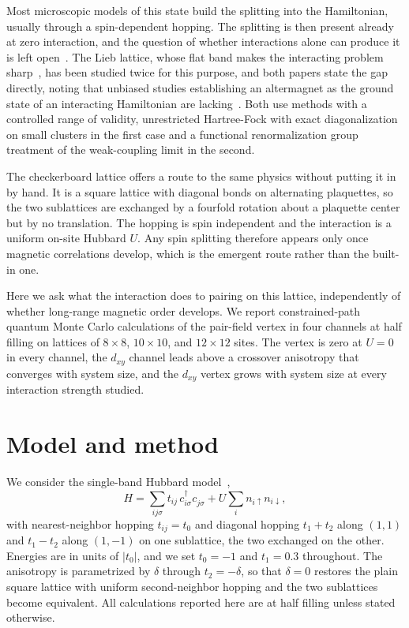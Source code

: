 \documentclass[aps,prb,reprint,superscriptaddress,amsmath,amssymb,floatfix]{revtex4-2}
\begin{document}
Most microscopic models of this state build the splitting into the Hamiltonian,
usually through a spin-dependent hopping. The splitting is then present already
at zero interaction, and the question of whether interactions alone can produce
it is left open~\cite{Leeb2024}. The Lieb lattice, whose flat band makes the
interacting problem sharp~\cite{Lieb1989,Mielke1991,Tasaki1992}, has been studied
twice for this purpose, and both papers state the gap directly,
noting that unbiased studies establishing an altermagnet as the ground state of
an interacting Hamiltonian are lacking~\cite{Kaushal2025,Duerrnagel2025}. Both
use methods with a controlled range of validity, unrestricted Hartree-Fock with
exact diagonalization on small clusters in the first case and a functional
renormalization group treatment of the weak-coupling limit in the second.

The checkerboard lattice offers a route to the same physics without putting it in
by hand. It is a square lattice with diagonal bonds on alternating plaquettes, so
the two sublattices are exchanged by a fourfold rotation about a plaquette center
but by no translation. The hopping is spin independent and the interaction is a
uniform on-site Hubbard $U$. Any spin splitting therefore appears only once
magnetic correlations develop, which is the emergent route rather than the
built-in one.

Here we ask what the interaction does to pairing on this lattice, independently
of whether long-range magnetic order develops. We report constrained-path
quantum Monte Carlo calculations of the pair-field vertex in four channels at
half filling on lattices of $8\times8$, $10\times10$, and $12\times12$ sites. The
vertex is zero at $U = 0$ in every channel, the $d_{xy}$ channel leads above a
crossover anisotropy that converges with system size, and the $d_{xy}$ vertex
grows with system size at every interaction strength studied.

\section{Model and method}
\label{sec:model}

We consider the single-band Hubbard model~\cite{Hubbard1963,Arovas2022},
\begin{equation}
H = \sum_{ij\sigma} t_{ij}\, c^{\dagger}_{i\sigma} c^{\phantom{\dagger}}_{j\sigma}
    + U \sum_i n_{i\uparrow} n_{i\downarrow},
\label{eq:H}
\end{equation}
with nearest-neighbor hopping $t_{ij} = t_0$ and diagonal hopping $t_1 + t_2$
along $(1,1)$ and $t_1 - t_2$ along $(1,-1)$ on one sublattice, the two exchanged
on the other. Energies are in units of $|t_0|$, and we set $t_0 = -1$ and
$t_1 = 0.3$ throughout. The anisotropy is parametrized by $\delta$ through
$t_2 = -\delta$, so that $\delta = 0$ restores the plain square lattice with
uniform second-neighbor hopping and the two sublattices become equivalent. All
calculations reported here are at half filling unless stated otherwise.
\end{document}
